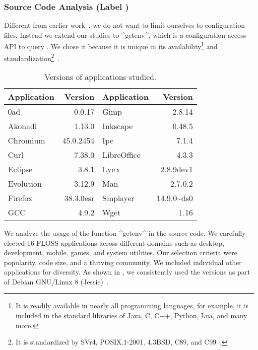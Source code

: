 \subsubsection{Source Code Analysis (Label \methodSource{})}

Different from earlier work~\cite{xu2013blame,zhang2014configuration,keller2008conferr,jin2014configurations}, we do not want to limit ourselves to configuration files.
Instead we extend our studies to ^getenv^, which is a configuration access API to query .
We chose it because it is unique in its availability\footnote{It is readily available in nearly all programming languages, for example, it is included in the standard libraries of Java, C, C++, Python, Lua, and many more.} and standardization\footnote{It is standardized by SVr4, POSIX.1-2001, 4.3BSD, C89, and C99~\cite{man2017getenv}.}~\cite{raab2017challenges}.

\begin{table}[htp]
\begin{tabularx}{\columnwidth}{l  R |  l R}
\toprule
{\bfseries Application} &
{Version} &
{\bfseries Application} &
{Version}
\\
\hline


0ad & 0.0.17                           &          Gimp & 2.8.14\\
Akonadi & 1.13.0                       &          Inkscape & 0.48.5\\
Chromium & 45.0.2454                   &          Ipe & 7.1.4\\
Curl & 7.38.0                          &          LibreOffice & 4.3.3\\
Eclipse & 3.8.1                        &          Lynx & 2.8.9dev1\\
Evolution & 3.12.9                     &          Man & 2.7.0.2\\
Firefox & 38.3.0esr                    &          Smplayer & 14.9.0\~{}ds0\\
GCC & 4.9.2                            &          Wget & 1.16\\

\hline

\bottomrule

\end{tabularx}
\caption{Versions of applications studied.}
\label{tab:versions}
\end{table}

We analyze the usage of the function ^getenv^ in the source code.
We carefully elected 16 FLOSS applications across different domains such as desktop, development, mobile, games, and system utilities.
Our selection criteria were popularity, code size, and a thriving community.
We included individual other applications for diversity.
As shown in , we consistently used the versions as part of Debian GNU/Linux 8 (Jessie)~\cite{raab2017challenges}.


